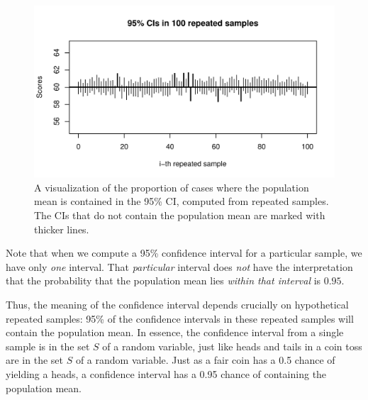 \documentclass[12pt]{book}\usepackage[]{graphicx}\usepackage[]{color}
\makeatletter
\def\maxwidth{ %
  \ifdim\Gin@nat@width>\linewidth
    \linewidth
  \else
    \Gin@nat@width
  \fi
}
\newenvironment{knitrout}{}{} %
\makeatother
\begin{document}
\begin{figure}
\begin{knitrout}
\color{fgcolor}
\includegraphics[width=\maxwidth]{figure/unnamed-chunk-36-1} 

\end{knitrout}
\caption{A visualization of the proportion of cases where the
  population mean is contained in the 95\% CI, computed from repeated samples. The CIs that do not contain the population mean are marked with thicker lines.}\label{repeatedCIsplot}
\end{figure}


Note that when we compute a 95\% confidence interval for a particular
sample, we have only \emph{one} interval. 
That \textit{particular} interval does
\emph{not} have the interpretation that the probability that the population mean lies
\emph{within that interval} is $0.95$. 

Thus, the meaning of the confidence interval
depends crucially on hypothetical repeated samples: 95\% of the confidence
intervals in these repeated samples will contain the
population mean. In essence, the confidence interval from a single
sample is in the set $S$ of a random variable, just like heads and tails in a coin toss are in the set $S$ of a random variable. Just as a
fair coin has a 0.5 chance of yielding a heads, a confidence interval has a 0.95 chance of containing the population mean.
\end{document}
